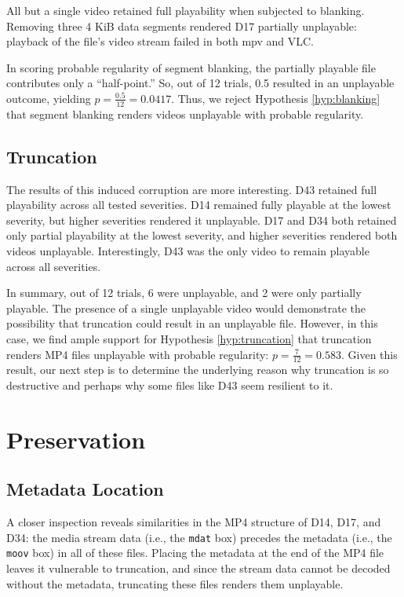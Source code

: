 All but a single video retained full playability when subjected to blanking. Removing three 4 KiB data segments rendered D17 partially unplayable: playback of the file's video stream failed in both mpv and VLC.

In scoring probable regularity of segment blanking, the partially playable file contributes only a ``half-point.'' So, out of 12 trials, 0.5 resulted in an unplayable outcome, yielding \( p = \frac{0.5}{12} = 0.0417 \). Thus, we reject Hypothesis \ref{hyp:blanking} that segment blanking renders videos unplayable with probable regularity.

\subsection{Truncation}

The results of this induced corruption are more interesting. D43 retained full playability across all tested severities. D14 remained fully playable at the lowest severity, but higher severities rendered it unplayable. D17 and D34 both retained only partial playability at the lowest severity, and higher severities rendered both videos unplayable. Interestingly, D43 was the only video to remain playable across all severities.

In summary, out of 12 trials, 6 were unplayable, and 2 were only partially playable. The presence of a single unplayable video would demonstrate the possibility that truncation could result in an unplayable file. However, in this case, we find ample support for Hypothesis \ref{hyp:truncation} that truncation renders MP4 files unplayable with probable regularity: \( p = \frac{7}{12} = 0.583 \). Given this result, our next step is to determine the underlying reason why truncation is so destructive and perhaps why some files like D43 seem resilient to it.

\section{Preservation}

\subsection{Metadata Location}

A closer inspection reveals similarities in the MP4 structure of D14, D17, and D34: the media stream data (i.e., the \texttt{mdat} box) precedes the metadata (i.e., the \texttt{moov} box) in all of these files. Placing the metadata at the end of the MP4 file leaves it vulnerable to truncation, and since the stream data cannot be decoded without the metadata, truncating these files renders them unplayable.

